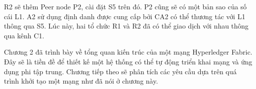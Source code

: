 \documentclass[../DoAn.tex]{subfiles}
\begin{document}
R2 sẽ thêm Peer node P2, cài đặt S5 trên đó. P2 cũng sẽ có một bản sao của số
cái L1. A2 sử dụng định danh được cung cấp bởi CA2 có thể thương tác với L1
thông qua S5. Lúc này, hai tổ chức R1 và R2 đã có thể giao dịch với nhau thông
qua kênh C1.

Chương 2 đã trình bày về tổng quan kiến trúc của một mạng Hyperledger Fabric. Đây sẽ là tiền đề để thiết kế một hệ thống có thể tự động triển khai mạng và ứng dụng phi tập trung. Chương tiếp theo sẽ phân tích các yêu cầu dựa trên quá trình khởi tạo một mạng như đã nói ở chương này.
\end{document}
